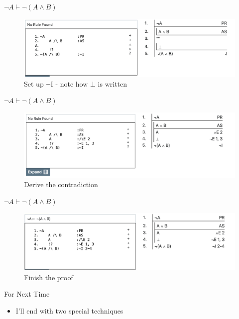 \documentclass[
  ignorenonframetext,
]{beamer}
\providecommand{\tightlist}{%
  \setlength{\itemsep}{0pt}\setlength{\parskip}{0pt}}
\renewcommand{\,}{\text{, }}
\begin{document}
\begin{frame}{\(\neg A \vdash \neg (A \wedge B)\)}
\protect\hypertarget{neg-a-vdash-neg-a-wedge-b-1}{}
\begin{figure}
\centering
\includegraphics[width=\textwidth,height=0.75\textheight]{5_5g.png}
\caption{Set up \(\neg\)I - note how \(\bot\) is written}
\end{figure}
\end{frame}

\begin{frame}{\(\neg A \vdash \neg (A \wedge B)\)}
\protect\hypertarget{neg-a-vdash-neg-a-wedge-b-2}{}
\begin{figure}
\centering
\includegraphics[width=\textwidth,height=0.75\textheight]{5_5h.png}
\caption{Derive the contradiction}
\end{figure}
\end{frame}

\begin{frame}{\(\neg A \vdash \neg (A \wedge B)\)}
\protect\hypertarget{neg-a-vdash-neg-a-wedge-b-3}{}
\begin{figure}
\centering
\includegraphics[width=\textwidth,height=0.75\textheight]{5_5i.png}
\caption{Finish the proof}
\end{figure}
\end{frame}

\begin{frame}{For Next Time}
\protect\hypertarget{for-next-time}{}
\begin{itemize}
\tightlist
\item
  I'll end with two special techniques
\end{itemize}
\end{frame}
\end{document}
